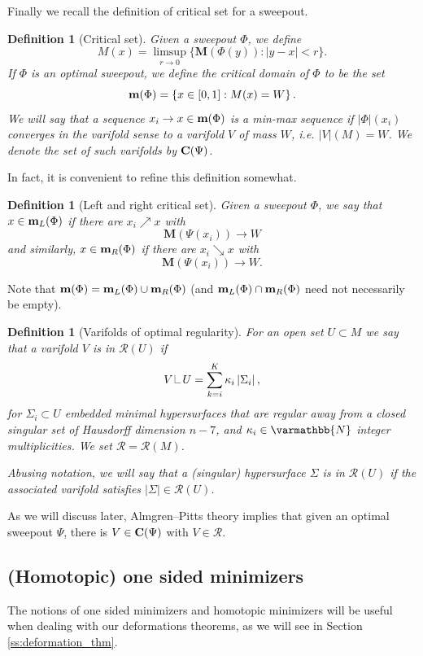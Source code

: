 \documentclass[12pt,twoside]{amsart}
\numberwithin{equation}{section}
\renewcommand{\mathbb}{\varmathbb}
\newtheorem{definition}[theorem]{Definition}
\newcommand{\NN}{\mathbb{N}}
\newcommand{\C}{{\bf C}}
\renewcommand{\cR}{\mathcal R}
\newcommand{\mm}{{\bf m}}
\newcommand{\bM}{\mathbf{M}}
\newcommand\res{\mathop{\hbox{\vrule height 7pt width .3pt depth 0pt
\vrule height .3pt width 5pt depth 0pt}}\nolimits}
\begin{document}
Finally we recall the definition of critical set for a sweepout. 

\begin{definition}[Critical set]
	Given a sweepout $\Phi$, we define
	$$
	M(x) = \limsup_{r \rightarrow 0} \{\bM(\Phi(y)): |y-x| < r\}.
	$$
	If $\Phi$ is an optimal sweepout, we define the \emph{critical domain of $\Phi$} to be the set 
	$$
	\mm(\Phi)=\{ x \in [0,1]: M(x) =W \}\,.
	$$
	We will say that a sequence $x_i \rightarrow x \in \mm(\Phi)$ is a \emph{min-max sequence} if $|\Phi|(x_i)$ converges in the varifold sense to a varifold $V$ of mass $W$, i.e. $|V|(M)=W$. We denote the set of such varifolds by $\C(\Psi)$. 
\end{definition}

In fact, it is convenient to refine this definition somewhat. 

\begin{definition}[Left and right critical set]
Given a sweepout $\Phi$, we say that $x\in \mm_L(\Phi)$ if there are $x_i\nearrow x$ with 
\[
\bM(\Psi(x_i)) \to W
\]
and similarly, $x\in \mm_R(\Phi)$ if there are $x_i\searrow x$ with 
\[
\bM(\Psi(x_i)) \to W. 
\]
\end{definition}

Note that $\mm(\Phi) = \mm_L(\Phi) \cup \mm_R(\Phi)$ (and $\mm_L(\Phi) \cap \mm_R(\Phi)$ need not necessarily be empty).

\begin{definition}[Varifolds of optimal regularity]
For an open set $U \subset M$ we say that a varifold $V$ is in $\cR(U)$ if 
\[
V\res U = \sum_{k=i}^K \kappa_i \,|\Sigma_i|\,,
\]
for $\Sigma_i\subset U$ embedded minimal hypersurfaces that are regular away from  a closed singular set of Hausdorff dimension $n-7$, and $\kappa_i\in\NN$ integer multiplicities. We set $\cR = \cR(M)$. 

Abusing notation, we will say that a (singular) hypersurface $\Sigma$ is in $\cR(U)$ if the associated varifold satisfies $|\Sigma|\in\cR(U)$. 
\end{definition}

As we will discuss later, Almgren--Pitts theory \cite{Pitts} implies that given an optimal sweepout $\Psi$, there is $V\in\C(\Psi)$ with $V \in \cR$. 

\subsection{(Homotopic) one sided minimizers} 
The notions of one sided minimizers and homotopic minimizers will be useful when dealing with our deformations theorems, as we will see in Section \ref{ss:deformation_thm}. 
\end{document}
